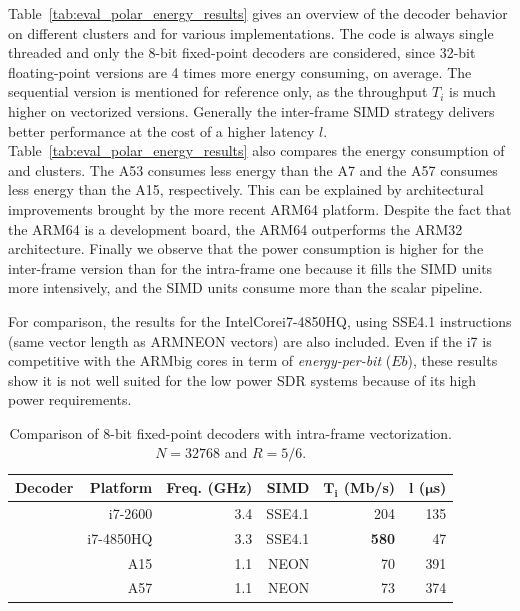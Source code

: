 Table~\ref{tab:eval_polar_energy_results} gives an overview of the decoder
behavior on different clusters and for various implementations. The code is
always single threaded and only the 8-bit fixed-point decoders are considered,
since 32-bit floating-point versions  are 4 times more energy consuming, on
average. The sequential version is mentioned for reference only, as the
throughput $T_i$ is much higher on vectorized versions. Generally the
inter-frame SIMD strategy delivers better performance at the cost of a higher
latency $l$. Table~\ref{tab:eval_polar_energy_results} also compares the energy
consumption of \little and \big clusters. The A53 consumes less energy than the
A7 and the A57 consumes less energy than the A15, respectively. This can be
explained by architectural improvements brought by the more recent ARM64
platform. Despite the fact that the ARM64 is a development board, the ARM64
outperforms the ARM32 architecture. Finally we observe that the power
consumption is higher for the inter-frame version than for the intra-frame one
because it fills the SIMD units more intensively, and the SIMD units consume
more than the scalar pipeline.

For comparison, the results for the Intel\R Core\TM i7-4850HQ, using SSE4.1
instructions (same vector length as ARM\R NEON vectors) are also included. Even
if the i7 is competitive with the ARM\R big cores in term of
\textit{energy-per-bit} ($E b$), these results show it is not well suited for
the low power SDR systems because of its high power requirements.

\begin{table}
  \caption{Comparison of 8-bit fixed-point decoders with intra-frame
    vectorization. $N = 32768$ and $R = 5/6$.}
  \label{tab:eval_polar_energy_comparison}
  \begin{center}
  \begin{tabular}{r r r r r r}
    \textbf{Decoder} &
    \textbf{Platform} &
    \textbf{Freq. (GHz)} &
    \textbf{SIMD} &
    $\boldsymbol{T_i}$ \textbf{(Mb/s)} &
    $\boldsymbol{l}$   \textbf{($\boldsymbol{\mu}$s)}\\
    \hline
    \hline
    \cite{Giard2014}     & i7-2600   & 3.4 & SSE4.1 &         204  &  135 \\ %
    \cite{Cassagne2016b} & i7-4850HQ & 3.3 & SSE4.1 & \textbf{580} &   47 \\ %
    \cite{Cassagne2016b} & A15       & 1.1 & NEON   &          70  &  391 \\ %
    \cite{Cassagne2016b} & A57       & 1.1 & NEON   &          73  &  374 \\
  \end{tabular}
  \end{center}
\end{table}

